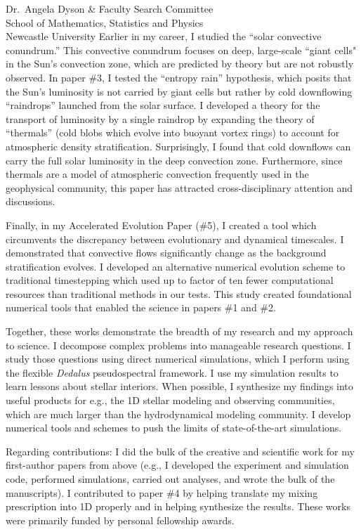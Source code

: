 \documentclass[12pt, a4paper]{letter}
\begin{document}
\begin{letter}{
        Dr.~Angela Dyson \& Faculty Search Committee \\
        School of Mathematics, Statistics and Physics \\
        Newcastle University}
    Earlier in my career, I studied the ``solar convective conundrum.''
    This convective conundrum focuses on deep, large-scale ``giant cells" in the Sun's convection zone, which are predicted by theory but are not robustly observed.
    In paper \#3, I tested the ``entropy rain'' hypothesis, which posits that the Sun’s luminosity is not carried by giant cells but rather by cold downflowing ``raindrops'' launched from the solar surface.
    I developed a theory for the transport of luminosity by a single raindrop by expanding the theory of ``thermals'' (cold blobs which evolve into buoyant vortex rings) to account for atmospheric density stratification.
    Surprisingly, I found that cold downflows can carry the full solar luminosity in the deep convection zone.
    Furthermore, since thermals are a model of atmospheric convection frequently used in the geophysical community, this paper has attracted cross-disciplinary attention and discussions.

    Finally, in my Accelerated Evolution Paper (\#5), I created a tool which circumvents the discrepancy between evolutionary and dynamical timescales.
    I demonstrated that convective flows significantly change as the background stratification evolves.
    I developed an alternative numerical evolution scheme to traditional timestepping which used up to factor of ten fewer computational resources than traditional methods in our tests. 
    This study created foundational numerical tools that enabled the science in papers \#1 and \#2.

    Together, these works demonstrate the breadth of my research and my approach to science.
    I decompose complex problems into manageable research questions.
    I study those questions using direct numerical simulations, which I perform using the flexible \emph{Dedalus} pseudospectral framework. 
    I use my simulation results to learn lessons about stellar interiors.
    When possible, I synthesize my findings into useful products for e.g., the 1D stellar modeling and observing communities, which are much larger than the hydrodynamical modeling community.
    I develop numerical tools and schemes to push the limits of state-of-the-art simulations.

    Regarding contributions: I did the bulk of the creative and scientific work for my first-author papers from above (e.g., I developed the experiment and simulation code, performed simulations, carried out analyses, and wrote the bulk of the manuscripts).
    I contributed to paper \#4 by helping translate my mixing prescription into 1D properly and in helping synthesize the results.
    These works were primarily funded by personal fellowship awards.



\end{letter}
\end{document}

